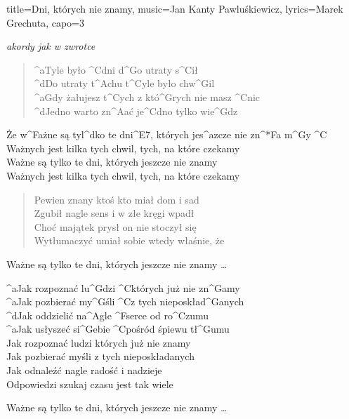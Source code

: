 \newpage
\begin{song}{title={Dni, których nie znamy}, music={Jan Kanty Pawluśkiewicz}, lyrics={Marek Grechuta}, capo=3}
    \begin{intro}
   		\textit{akordy jak w zwrotce}
   	\end{intro}
   	\begin{verse}
   		^{a}Tyle było ^{C}dni d^{G}o utraty s^{C}ił \\
		^{d}Do utraty t^{A}chu t^{C}yle było chw^{G}il \\
		^{a}Gdy żałujesz t^{C}ych z któ^{G}rych nie masz ^{C}nic \\
		^{d}Jedno warto zn^{A}ać je^{C}dno tylko wie^{G}dz
   	\end{verse}
   	\begin{chorus}
   		Że w^{F}ażne są tyl^{d}ko te dni^{E7}, których jes^{a}zcze nie zn^*{F}a m^{G}y ^{C} \\
		Ważnych jest kilka tych chwil, tych, na które czekamy \\
		Ważne są tylko te dni, których jeszcze nie znamy \\
		Ważnych jest kilka tych chwil, tych, na które czekamy
   	\end{chorus}
   	\begin{verse}
   		Pewien znany ktoś kto miał dom i sad \\
		Zgubił nagle sens i w złe kręgi wpadł \\
		Choć majątek prysł on nie stoczył się \\
		Wytłumaczyć umiał sobie wtedy właśnie, że 
   	\end{verse}
   	\begin{chorus}
   		Ważne są tylko te dni, których jeszcze nie znamy \ldots
   	\end{chorus}
   	\begin{interlude}
   		^{a}Jak rozpoznać lu^{G}dzi ^{C}których już nie zn^{G}amy \\
	   	^{a}Jak pozbierać my^{G}śli ^{C}z tych nieposkład^{G}anych \\
	   	^{d}Jak oddzielić na^{A}gle ^{F}serce od ro^{C}zumu \\
   		^{a}Jak usłyszeć si^{G}ebie ^{C}pośród śpiewu tł^{G}umu \\
		Jak rozpoznać ludzi których już nie znamy \\
		Jak pozbierać myśli z tych nieposkładanych \\
		Jak odnaleźć nagle radość i nadzieje \\ 
		Odpowiedzi szukaj czasu jest tak wiele
   	\end{interlude}
   	\begin{chorus}
   		Ważne są tylko te dni, których jeszcze nie znamy \ldots
   	\end{chorus}
\end{song}

